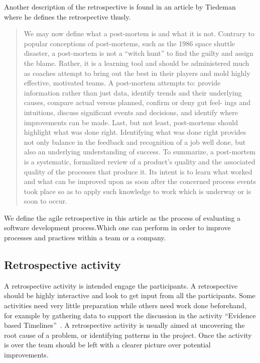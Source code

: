 \documentclass[12pt]{article}
\begin{document}
Another description of the retrospective is found in an article by Tiedeman~\cite{Tiedeman1990} where he defines the retrospective thusly.

\begin{quote} 
We may now define what a post-mortem is and what it
is not. Contrary to popular conceptions of post-mortems,
such as the 1986 space shuttle disaster, a post-mortem is
not a “witch hunt” to find the guilty and assign the blame.
Rather, it is a learning tool and should be administered
much as coaches attempt to bring out the best in their
players and mold highly effective, motivated teams. A
post-mortem attempts to: provide information rather than
just data, identify trends and their underlying causes,
compare actual versus planned, confirm or deny gut feel-
ings and intuitions, discuss significant events and decisions,
 and identify where improvements can be made.
Last, but not least, post-mortems should highlight what
was done right. Identifying what was done right provides
not only balance in the feedback and recognition of a job
well done, but also an underlying understanding of success. 
To summarize, a post-mortem is a systematic, formalized 
review of a product’s quality and the associated
quality of the processes that produce it. Its intent is to
learn what worked and what can be improved upon as soon
after the concerned process events took place so as to apply
 such knowledge to work which is underway or is soon
to occur.
\end{quote}

We define the agile retrospective in this article as the process of evaluating a software development process.Which one can perform in order to improve processes and practices within a team or a company.




\subsection{Retrospective activity}
A retrospective activity is intended engage the participants. A retrospective should be highly interactive and look to get input from all the participants. Some activities need very little preparation while others need work done beforehand, for example by gathering data to support the discussion in the activity ``Evidence based Timelines''~\cite{Bjarnason2012}. A retrospective activity is usually aimed at uncovering the root cause of a problem, or identifying patterns in the project. Once the activity is over the team should be left with a clearer picture over potential improvements.
\end{document}
